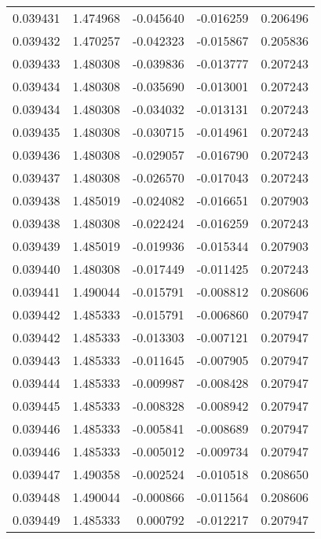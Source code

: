 \begin{tabular}{lrrrr}
0.039431    &  1.474968 & -0.045640 & -0.016259 &             0.206496 \\
0.039432    &  1.470257 & -0.042323 & -0.015867 &             0.205836 \\
0.039433    &  1.480308 & -0.039836 & -0.013777 &             0.207243 \\
0.039434    &  1.480308 & -0.035690 & -0.013001 &             0.207243 \\
0.039434    &  1.480308 & -0.034032 & -0.013131 &             0.207243 \\
0.039435    &  1.480308 & -0.030715 & -0.014961 &             0.207243 \\
0.039436    &  1.480308 & -0.029057 & -0.016790 &             0.207243 \\
0.039437    &  1.480308 & -0.026570 & -0.017043 &             0.207243 \\
0.039438    &  1.485019 & -0.024082 & -0.016651 &             0.207903 \\
0.039438    &  1.480308 & -0.022424 & -0.016259 &             0.207243 \\
0.039439    &  1.485019 & -0.019936 & -0.015344 &             0.207903 \\
0.039440    &  1.480308 & -0.017449 & -0.011425 &             0.207243 \\
0.039441    &  1.490044 & -0.015791 & -0.008812 &             0.208606 \\
0.039442    &  1.485333 & -0.015791 & -0.006860 &             0.207947 \\
0.039442    &  1.485333 & -0.013303 & -0.007121 &             0.207947 \\
0.039443    &  1.485333 & -0.011645 & -0.007905 &             0.207947 \\
0.039444    &  1.485333 & -0.009987 & -0.008428 &             0.207947 \\
0.039445    &  1.485333 & -0.008328 & -0.008942 &             0.207947 \\
0.039446    &  1.485333 & -0.005841 & -0.008689 &             0.207947 \\
0.039446    &  1.485333 & -0.005012 & -0.009734 &             0.207947 \\
0.039447    &  1.490358 & -0.002524 & -0.010518 &             0.208650 \\
0.039448    &  1.490044 & -0.000866 & -0.011564 &             0.208606 \\
0.039449    &  1.485333 &  0.000792 & -0.012217 &             0.207947 \\

\end{tabular}
